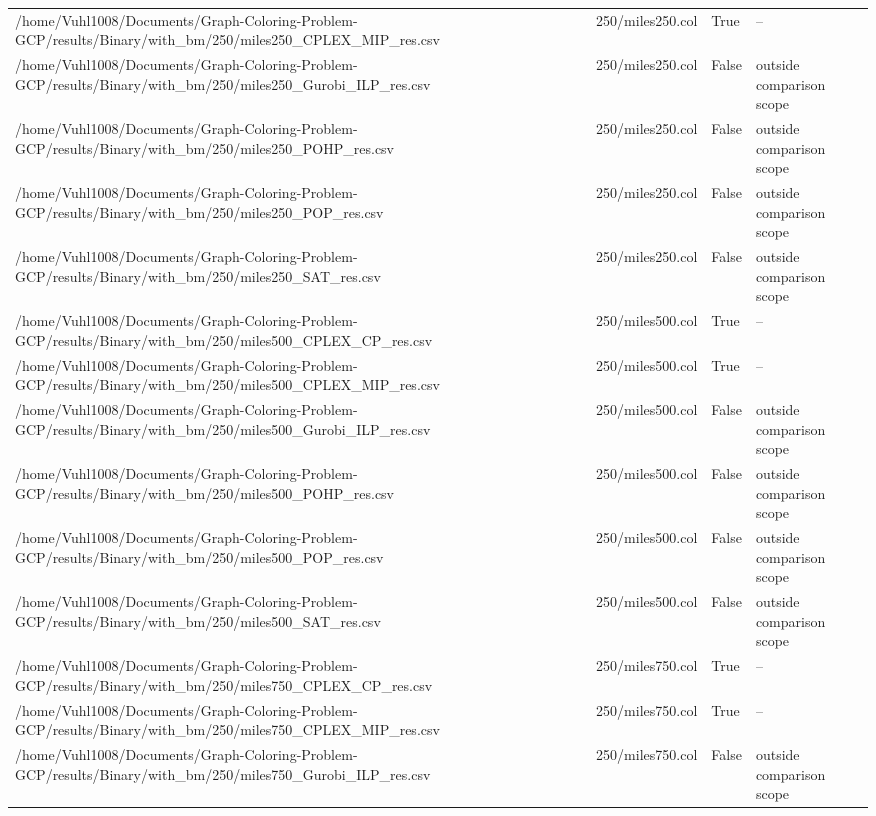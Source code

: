 \begin{table}[htbp]
\begin{tabular}{llll}
/home/Vuhl1008/Documents/Graph-Coloring-Problem-GCP/results/Binary/with\_bm/250/miles250\_CPLEX\_MIP\_res.csv & 250/miles250.col & True & -- \\
/home/Vuhl1008/Documents/Graph-Coloring-Problem-GCP/results/Binary/with\_bm/250/miles250\_Gurobi\_ILP\_res.csv & 250/miles250.col & False & outside comparison scope \\
/home/Vuhl1008/Documents/Graph-Coloring-Problem-GCP/results/Binary/with\_bm/250/miles250\_POHP\_res.csv & 250/miles250.col & False & outside comparison scope \\
/home/Vuhl1008/Documents/Graph-Coloring-Problem-GCP/results/Binary/with\_bm/250/miles250\_POP\_res.csv & 250/miles250.col & False & outside comparison scope \\
/home/Vuhl1008/Documents/Graph-Coloring-Problem-GCP/results/Binary/with\_bm/250/miles250\_SAT\_res.csv & 250/miles250.col & False & outside comparison scope \\
/home/Vuhl1008/Documents/Graph-Coloring-Problem-GCP/results/Binary/with\_bm/250/miles500\_CPLEX\_CP\_res.csv & 250/miles500.col & True & -- \\
/home/Vuhl1008/Documents/Graph-Coloring-Problem-GCP/results/Binary/with\_bm/250/miles500\_CPLEX\_MIP\_res.csv & 250/miles500.col & True & -- \\
/home/Vuhl1008/Documents/Graph-Coloring-Problem-GCP/results/Binary/with\_bm/250/miles500\_Gurobi\_ILP\_res.csv & 250/miles500.col & False & outside comparison scope \\
/home/Vuhl1008/Documents/Graph-Coloring-Problem-GCP/results/Binary/with\_bm/250/miles500\_POHP\_res.csv & 250/miles500.col & False & outside comparison scope \\
/home/Vuhl1008/Documents/Graph-Coloring-Problem-GCP/results/Binary/with\_bm/250/miles500\_POP\_res.csv & 250/miles500.col & False & outside comparison scope \\
/home/Vuhl1008/Documents/Graph-Coloring-Problem-GCP/results/Binary/with\_bm/250/miles500\_SAT\_res.csv & 250/miles500.col & False & outside comparison scope \\
/home/Vuhl1008/Documents/Graph-Coloring-Problem-GCP/results/Binary/with\_bm/250/miles750\_CPLEX\_CP\_res.csv & 250/miles750.col & True & -- \\
/home/Vuhl1008/Documents/Graph-Coloring-Problem-GCP/results/Binary/with\_bm/250/miles750\_CPLEX\_MIP\_res.csv & 250/miles750.col & True & -- \\
/home/Vuhl1008/Documents/Graph-Coloring-Problem-GCP/results/Binary/with\_bm/250/miles750\_Gurobi\_ILP\_res.csv & 250/miles750.col & False & outside comparison scope \\

\end{tabular}
\end{table}

